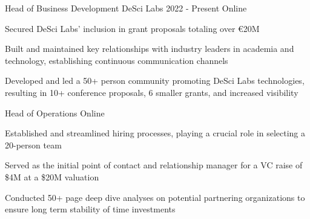 
\begin{cventries}

  \cventry
    {Head of Business Development} %
    {DeSci Labs} %
    {2022 - Present} %
    {Online} %
    {
      \begin{cvitems} %
        \item {Secured DeSci Labs' inclusion in grant proposals totaling over €20M}
        \item {Built and maintained key relationships with industry leaders in academia and technology, establishing continuous communication channels}
        \item {Developed and led a 50+ person community promoting DeSci Labs technologies, resulting in 10+ conference proposals, 6 smaller grants, and increased visibility}
      \end{cvitems}
    }

  \cventry
    {Head of Operations} %
    {} %
    {} %
    {Online} %
    {
      \begin{cvitems} %
        \item {Established and streamlined hiring processes, playing a crucial role in selecting a 20-person team}
        \item {Served as the initial point of contact and relationship manager for a VC raise of \$4M at a \$20M valuation}
        \item {Conducted 50+ page deep dive analyses on potential partnering organizations to ensure long term stability of time investments}
      \end{cvitems}
    }


\end{cventries}
